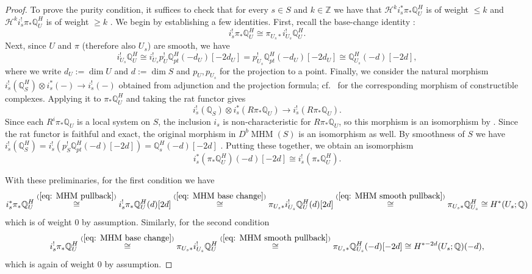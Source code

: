 \documentclass[11pt,reqno]{amsart}
\theoremstyle{plain} %
\theoremstyle{definition}
\newcommand{\QQ}{\mathbb{Q}}
\newcommand{\mc}{\mathcal}
\newcommand{\ZZ}{\mathbb{Z}}
\DeclareMathOperator{\MHM}{MHM}
\begin{document}
\begin{proof}
    To prove the purity condition, it suffices to check that for every $s \in S$ and $k \in \ZZ$ we have that $\mc H^k i_s^* \pi_* \QQ^H_U$ is of weight $\le k$ and $\mc H^k i_s^! \pi_* \QQ_U^H$ is of weight $\ge k$ \cite[(4.6.1)]{Saito}. We begin by establishing a few identities. First, recall the base-change identity \cite[(4.4.3)]{Saito}:
    \begin{equation} \label{eq: MHM base change}
        i_s^! \pi_* \QQ^H_U \cong \pi_{U_s *} i^!_{U_s} \QQ_U^H.
    \end{equation}
    Next, since $U$ and $\pi$ (therefore also $U_s$) are smooth, we have \cite[(4.4.2)]{Saito}
    \begin{equation} \label{eq: MHM smooth pullback}
      i_{U_s}^! \QQ^H_U \cong i^!_{U_s} p_U^! \QQ_{pt}^H(-d_U)[-2d_U] = p_{U_s}^! \QQ^H_{pt}(-d_U)[-2d_U] \cong \QQ^H_{U_s}(-d)[-2d], 
    \end{equation}
    where we write $d_U := \dim U$ and $d := \dim S$ and $p_U, p_{U_s}$ for the projection to a point.
    Finally, we consider the natural morphism $i_s^!(\QQ^H_S) \otimes i_s^*(-) \to i_s^!(-)$ obtained from adjunction and the projection formula; cf.~\cite[Proposition~3.1.11]{Kashiwara-Schapira} for the corresponding morphism of constructible complexes. Applying it to $\pi_* \QQ^H_U$ and taking the rat functor gives
    $$i_s^!(\QQ_S) \otimes i_s^*(R\pi_* \QQ_U) \longrightarrow i_s^!(R\pi_* \QQ_U).$$
    Since each $R^i\pi_* \QQ_U$ is a local system on $S$, the inclusion $i_s$ is non-characteristic for $R\pi_*\QQ_U$, so this morphism is an isomorphism by \cite[Proposition~5.4.13]{Kashiwara-Schapira}. Since the rat functor is faithful and exact, the original morphism in $D^b\MHM(S)$ is an isomorphism as well.
    By smoothness of $S$ we have $i_s^!(\QQ^H_S) = i_s^!(p_S^! \QQ^H_{pt}(-d)[-2d]) = \QQ_s^H(-d)[-2d]$ \cite[(4.4.2)]{Saito}. Putting these together, we obtain an isomorphism
    \begin{equation} \label{eq: MHM pullback}
        i_s^*(\pi_* \QQ_U^H)(-d)[-2d] \cong i_s^!(\pi_* \QQ_U^H).
    \end{equation}
    
    With these preliminaries, for the first condition we have
    $$i_s^* \pi_* \QQ^H_U \overset{(\ref{eq: MHM pullback})}{\cong} i_s^! \pi_* \QQ^H_U(d)[2d] \overset{(\ref{eq: MHM base change})}{\cong} \pi_{U_s *} i^!_{U_s} \QQ^H_U(d)[2d] \overset{(\ref{eq: MHM smooth pullback})}{\cong} \pi_{U_s *} \QQ^H_{U_s} \cong H^*(U_s; \QQ)$$
    which is of weight 0 by assumption.
    Similarly, for the second condition
    $$i_s^! \pi_* \QQ^H_U \overset{(\ref{eq: MHM base change})}{\cong} \pi_{U_s *} i^!_{U_s} \QQ^H_U \overset{(\ref{eq: MHM smooth pullback})}{\cong} \pi_{U_s *} \QQ^H_{U_s}(-d)[-2d] \cong H^{* - 2d}(U_s; \QQ)(-d),$$
    which is again of weight 0 by assumption.


\end{proof}
\end{document}
